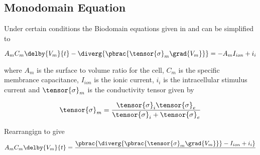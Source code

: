 
\subsection{Monodomain Equation}

Under certain conditions the Biodomain equations given in
 and  can be simplified to 

\begin{equation}
  A_{m}C_{m}\delby{V_{m}}{t}-\diverg{\pbrac{\tensor{\sigma}_{m}\grad{V_{m}}}}=-A_{m}I_{ion}+i_{i}
  \label{eqn:monodomain}
\end{equation}

where $A_{m}$ is the surface to volume ratio for the cell, $C_{m}$ is
the specific membrance capacitance, $I_{ion}$ is the ionic current, $i_{i}$ is the
intracellular stimulus current and $\tensor{\sigma}_{m}$ is the
conductivity tensor given by

\begin{equation}
  \tensor{\sigma}_{m}=\dfrac{\tensor{\sigma}_{i}\tensor{\sigma}_{e}}{\tensor{\sigma}_{i}+\tensor{\sigma}_{e}}
  \label{eqn:monodomainconductivity}
\end{equation}

Rearrangign  to give
\begin{equation}
  A_{m}C_{m}\delby{V_{m}}{t}=\dfrac{\pbrac{\diverg{\pbrac{\tensor{\sigma}_{m}\grad{V_{m}}}}-I_{ion}+i_{i}}}{}
\end{equation}
